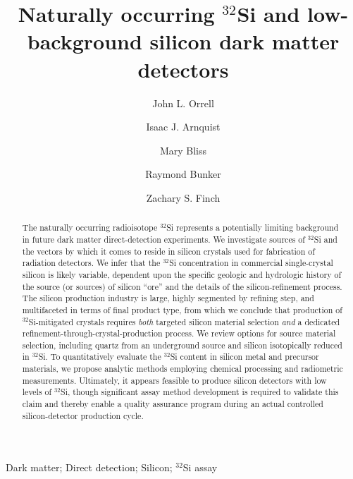 \documentclass[final,5p]{elsarticle}
\def\si{$^{32}$Si\xspace}
\begin{document}
\begin{frontmatter}

\title{\boldmath Naturally occurring \si and low-background silicon dark matter detectors}

\author[]{John L. Orrell}
\author[]{Isaac J. Arnquist}
\author[]{Mary Bliss}
\author[]{Raymond Bunker}
\author[]{Zachary S. Finch}
\address{Pacific Northwest National Laboratory, Richland, WA 99352, U.S.A.}

\begin{abstract}
The naturally occurring radioisotope \si represents a potentially limiting background in future dark matter direct-detection experiments. We investigate sources of \si and the vectors by which it comes to reside in silicon crystals used for fabrication of radiation detectors. We infer that the \si concentration in commercial single-crystal silicon is likely variable, dependent upon the specific geologic and hydrologic history of the source (or sources) of silicon ``ore'' and the details of the silicon-refinement process. The silicon production industry is large, highly segmented by refining step, and multifaceted in terms of final product type, from which we conclude that production of \si-mitigated crystals requires \textit{both} targeted silicon material selection \textit{and} a dedicated refinement-through-crystal-production process. We review options for source material selection, including quartz from an underground source and silicon isotopically reduced in \si. To quantitatively evaluate the \si content in silicon metal and precursor materials, we propose analytic methods employing chemical processing and radiometric measurements. Ultimately, it appears feasible to produce silicon detectors with low levels of \si, though significant assay method development is required to validate this claim and thereby enable a quality assurance program during an actual controlled silicon-detector production cycle.
\end{abstract}

\begin{keyword}
Dark matter; Direct detection; Silicon; \si assay
\end{keyword}

\end{frontmatter}
\end{document}
